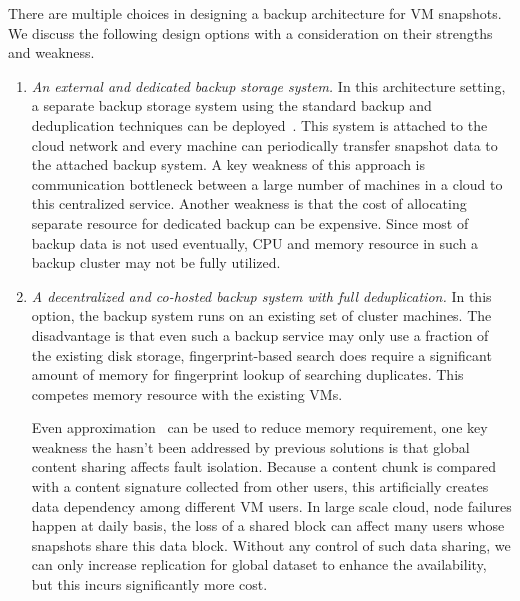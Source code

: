 There are multiple choices in designing a backup architecture  for VM snapshots.
We discuss the following design options with a consideration on their strengths and weakness.
\begin{enumerate}
\item  {\em An external and dedicated backup storage system.} 
In this architecture setting, a separate backup storage system using
the standard backup and deduplication techniques can be deployed~\cite{bottleneck08,extreme_binning09,sparseindex09}. 
This system is attached to the cloud network and every machine can periodically transfer snapshot data to 
the attached backup system. 
A key weakness of this approach is communication bottleneck between a large number of machines
in a cloud to this centralized  service.
Another weakness is that the cost of allocating separate resource for dedicated backup  can be expensive.
Since most of backup data is not used eventually, CPU and memory resource in such a backup cluster may not be fully utilized.
\item {\em A decentralized and co-hosted backup system with full deduplication.}
In this option, the backup system runs on an existing set of cluster machines.
The disadvantage is that 
even such a  backup service may only use  a fraction of the existing disk storage, 
fingerprint-based search does require a significant amount of memory for fingerprint lookup of searching duplicates.
This competes memory resource  with the existing VMs.

Even approximation~\cite{extreme_binning09,sparseindex09} can be used to reduce memory requirement,
one key weakness the hasn't been addressed by previous solutions is that global content sharing affects
fault isolation.
Because a content chunk is compared with a content signature collected from other users,
this artificially creates data dependency among different VM users.
In large scale cloud, node failures happen at daily basis,
the loss of a shared block can affect many users whose snapshots share this 
data block. 
Without any control of such data sharing, we can only increase  
replication for global dataset to enhance the availability,
but this incurs significantly more cost.


\end{enumerate}
